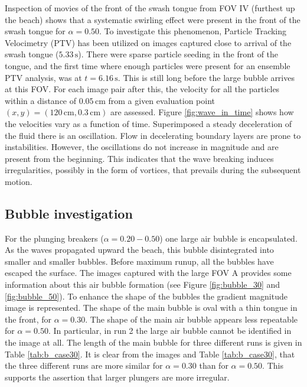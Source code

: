 \documentclass[review, authoryear]{elsarticle}
\newcommand{\s}{\,\mbox{s}}
\newcommand{\cm}{\,\mbox{cm}}
\begin{document}
Inspection of movies of the front of the swash tongue from FOV IV (furthest up the beach) shows that a systematic swirling effect were present in the front of the swash tongue for $\alpha=0.50$. To investigate this phenomenon, Particle Tracking Velocimetry (PTV) has been utilized on images captured close to arrival of the swash tongue ($5.33\s$). There were sparse particle seeding in the front of the tongue, and the first time where enough particles were present for an ensemble PTV analysis, was at $t=6.16\s$. This is still long before the large bubble arrives at this FOV. For each image pair after this, the velocity for all the particles within a distance of $0.05\cm$ from a given evaluation point $(x,y)=(120\cm,0.3\cm)$ are assessed. Figure \ref{fig:wave_in_time} shows how the velocities vary as a function of time. Superimposed a steady deceleration of the fluid there is an 
oscillation.
Flow in decelerating boundary layers are prone to instabilities.
However, the oscillations do not increase in magnitude and are present
from the beginning. 
   This indicates that the wave breaking induces irregularities, possibly in the form of vortices, that prevails during the subsequent motion. 


 
 \subsection{Bubble investigation}
 \label{bub_inv}
 For the plunging breakers ($\alpha=0.20-0.50$) one large air bubble is encapsulated. As the waves propagated upward the beach, this bubble disintegrated into smaller and smaller bubbles. Before maximum runup, all the 
bubbles have escaped the surface. The images captured with the large FOV A provides some information about this air bubble formation (see Figure \ref{fig:bubble_30} and \ref{fig:bubble_50}). To enhance the shape of the bubbles the gradient magnitude image is represented. The shape of the main bubble is oval with a thin tongue in the front, for $\alpha=0.30$. The shape of the main air bubble appears less repeatable for $\alpha=0.50$. In particular, in run 2 the large air bubble cannot
 be identified in the image at all. The length of the main bubble for three different runs is given in Table \ref{tab:b_case30}. It is clear from the images and Table \ref{tab:b_case30}, that the three different runs are more similar for $\alpha=0.30$ than for $\alpha=0.50$. This supports the assertion that larger plungers are more irregular.
 
\end{document}
